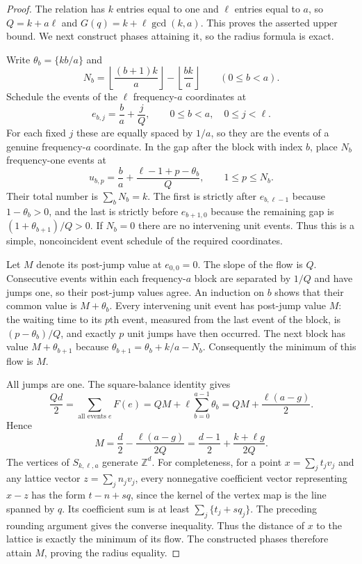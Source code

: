 \documentclass[11pt,a4paper]{article}
\theoremstyle{remark}\newtheorem{remark}[theorem]{Remark}
\begin{document}
\begin{proof}
The relation has $k$ entries equal to one and $\ell$ entries
equal to $a$, so $Q=k+a\ell$ and
$G(q)=k+\ell\gcd(k,a)$.  This proves the asserted upper bound.
We next construct phases attaining it, so the radius formula
is exact.

Write $\theta_b=\{kb/a\}$ and
\[
 N_b=\left\lfloor\frac{(b+1)k}{a}\right\rfloor
     -\left\lfloor\frac{bk}{a}\right\rfloor
 \qquad (0\le b<a).
\]
Schedule the events of the $\ell$ frequency-$a$ coordinates at
\[
 e_{b,j}=\frac ba+\frac jQ,
 \qquad 0\le b<a,\quad 0\le j<\ell.
\]
For each fixed $j$ these are equally spaced by $1/a$, so they
are the events of a genuine frequency-$a$ coordinate.
In the gap after the block with index $b$, place $N_b$
frequency-one events at
\[
 u_{b,p}=\frac ba+\frac{\ell-1+p-\theta_b}{Q},
 \qquad 1\le p\le N_b .
\]
Their total number is $\sum_bN_b=k$.  The first is strictly
after $e_{b,\ell-1}$ because $1-\theta_b>0$, and the last is
strictly before $e_{b+1,0}$ because the remaining gap is
$(1+\theta_{b+1})/Q>0$.  If $N_b=0$ there are no intervening
unit events.  Thus this is a simple, noncoincident event
schedule of the required coordinates.

Let $M$ denote its post-jump value at $e_{0,0}=0$.
The slope of the flow is $Q$.  Consecutive events within each
frequency-$a$ block are separated by $1/Q$ and have jumps
one, so their post-jump values agree.  An induction on $b$
shows that their common value is $M+\theta_b$.
Every intervening unit event has post-jump value $M$:
the waiting time to its $p$th event, measured from the last
event of the block, is $(p-\theta_b)/Q$, and exactly $p$
unit jumps have then occurred.  The next block has value
$M+\theta_{b+1}$ because
$\theta_{b+1}=\theta_b+k/a-N_b$.
Consequently the minimum of this flow is $M$.

All jumps are one.  The square-balance identity gives
\[
 \frac{Qd}{2}
 =\sum_{\text{all events }e}F(e)
 =QM+\ell\sum_{b=0}^{a-1}\theta_b
 =QM+\frac{\ell(a-g)}2.
\]
Hence
\[
 M=\frac d2-\frac{\ell(a-g)}{2Q}
   =\frac{d-1}{2}+\frac{k+\ell g}{2Q}.
\]
The vertices of $S_{k,\ell,a}$ generate $\mathbb Z^d$.
For completeness, for a point $x=\sum_jt_jv_j$ and any
lattice vector $z=\sum_jn_jv_j$, every nonnegative
coefficient vector representing $x-z$ has the form
$t-n+sq$, since the kernel of the vertex map is the line
spanned by $q$.  Its coefficient sum is at least
$\sum_j\{t_j+sq_j\}$.  The preceding rounding argument
gives the converse inequality.  Thus the distance of $x$
to the lattice is exactly the minimum of its flow.
The constructed phases therefore attain $M$, proving the
radius equality.


\end{proof}
\end{document}
